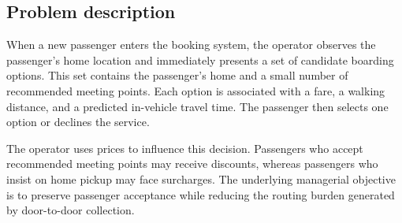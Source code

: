 \documentclass[preprint,12pt,authoryear]{elsarticle}
\begin{document}
\subsection{Problem description}

When a new passenger enters the booking system, the operator observes the passenger's home location and immediately presents a set of candidate boarding options. This set contains the passenger's home and a small number of recommended meeting points. Each option is associated with a fare, a walking distance, and a predicted in-vehicle travel time. The passenger then selects one option or declines the service.

The operator uses prices to influence this decision. Passengers who accept recommended meeting points may receive discounts, whereas passengers who insist on home pickup may face surcharges. The underlying managerial objective is to preserve passenger acceptance while reducing the routing burden generated by door-to-door collection.
\end{document}

